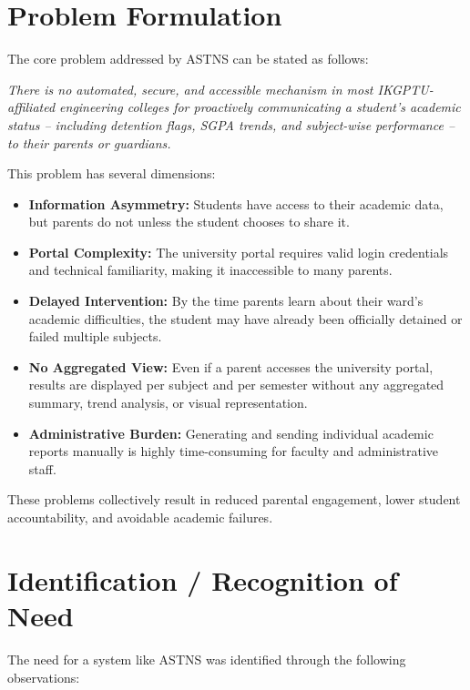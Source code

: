 \documentclass[12pt,a4paper]{report}
\begin{document}
\section{Problem Formulation}
The core problem addressed by ASTNS can be stated as follows:

\textit{There is no automated, secure, and accessible mechanism in most IKGPTU-affiliated engineering colleges for proactively communicating a student's academic status -- including detention flags, SGPA trends, and subject-wise performance -- to their parents or guardians.}

This problem has several dimensions:

\begin{itemize}
  \item \textbf{Information Asymmetry:} Students have access to their academic data, but parents do not unless the student chooses to share it.
  \item \textbf{Portal Complexity:} The university portal requires valid login credentials and technical familiarity, making it inaccessible to many parents.
  \item \textbf{Delayed Intervention:} By the time parents learn about their ward's academic difficulties, the student may have already been officially detained or failed multiple subjects.
  \item \textbf{No Aggregated View:} Even if a parent accesses the university portal, results are displayed per subject and per semester without any aggregated summary, trend analysis, or visual representation.
  \item \textbf{Administrative Burden:} Generating and sending individual academic reports manually is highly time-consuming for faculty and administrative staff.
\end{itemize}

These problems collectively result in reduced parental engagement, lower student accountability, and avoidable academic failures.

\section{Identification / Recognition of Need}
The need for a system like ASTNS was identified through the following observations:
\end{document}
